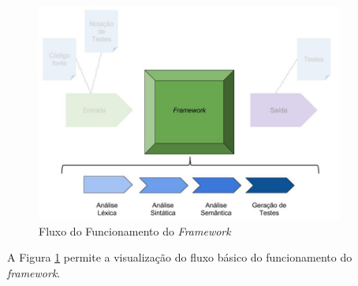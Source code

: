  \begin{figure}[h]
    \centering
    \includegraphics[width=0.9\textwidth]{figuras/Framework-interior (1).jpg}
    \caption{Fluxo do Funcionamento do \textit{Framework}}
    \label{fig:Framework-interior}
 \end{figure}
 
 \par
 \indent A Figura \ref{fig:Framework-interior} permite a visualização do fluxo básico do funcionamento do \textit{framework}.  

